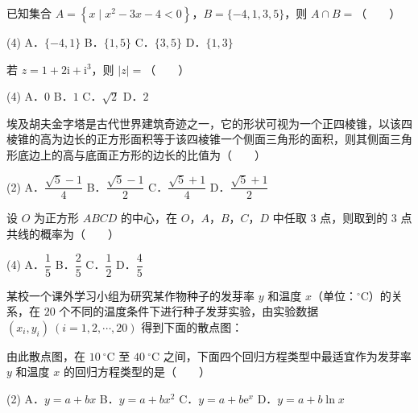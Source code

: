 \begin{question}
已知集合 $A=\left\{x\mid x^{2}-3x-4<0\right\}$，$B=\{-4,1,3,5\}$，则 $A\cap B=$\mbox{（　　）}

\begin{gkopts}(4)
\task A．$\{-4,1\}$
\task B．$\{1,5\}$
\task C．$\{3,5\}$
\task D．$\{1,3\}$
\end{gkopts}

\end{question}
\begin{question}
若 $z=1+2\mathrm i+\mathrm i^{3}$，则 $|z|=$\mbox{（　　）}

\begin{gkopts}(4)
\task A．$0$
\task B．$1$
\task C．$\sqrt2$
\task D．$2$
\end{gkopts}

\end{question}
\begin{question}
埃及胡夫金字塔是古代世界建筑奇迹之一，它的形状可视为一个正四棱锥，以该四棱锥的高为边长的正方形面积等于该四棱锥一个侧面三角形的面积，则其侧面三角形底边上的高与底面正方形的边长的比值为\mbox{（　　）}

\begin{gkopts}(2)
\task A．$\dfrac{\sqrt5-1}4$
\task B．$\dfrac{\sqrt5-1}2$
\task C．$\dfrac{\sqrt5+1}4$
\task D．$\dfrac{\sqrt5+1}2$
\end{gkopts}

\end{question}
\begin{question}
设 $O$ 为正方形 $ABCD$ 的中心，在 $O$，$A$，$B$，$C$，$D$ 中任取 $3$ 点，则取到的 $3$ 点共线的概率为\mbox{（　　）}

\begin{gkopts}(4)
\task A．$\dfrac15$
\task B．$\dfrac25$
\task C．$\dfrac12$
\task D．$\dfrac45$
\end{gkopts}

\Needspace{0.4\textheight}
\end{question}
\begin{question}
某校一个课外学习小组为研究某作物种子的发芽率 $y$ 和温度 $x$（单位：$^\circ\mathrm C$）的关系，在 $20$ 个不同的温度条件下进行种子发芽实验，由实验数据 $\left(x_i,y_i\right)\ (i=1,2,\cdots,20)$ 得到下面的散点图：
\nopagebreak[4]
\begin{center}\end{center}
\nopagebreak[4]
由此散点图，在 $10\ ^\circ\mathrm C$ 至 $40\ ^\circ\mathrm C$ 之间，下面四个回归方程类型中最适宜作为发芽率 $y$ 和温度 $x$ 的回归方程类型的是\mbox{（　　）}

\begin{gkopts}(2)
\task A．$y=a+bx$
\task B．$y=a+bx^{2}$
\task C．$y=a+b\mathrm e^{x}$
\task D．$y=a+b\ln x$
\end{gkopts}

\end{question}
